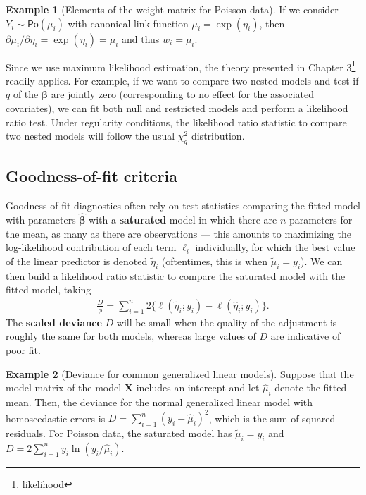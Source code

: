 \documentclass[
  11pt,
  letterpaper,
]{book}
\renewcommand{\href}[2]{#2\footnote{\url{#1}}}
\theoremstyle{definition}
\theoremstyle{definition}
\newtheorem{example}{Example}[chapter]
\theoremstyle{definition}
\theoremstyle{definition}
\theoremstyle{remark}
\begin{document}
\begin{example}[Elements of the weight matrix for Poisson data]
\protect\hypertarget{exm:weightpois}{}{\label{exm:weightpois} {} }If we consider \(Y_i \sim \mathsf{Po}(\mu_i)\) with canonical link function \(\mu_i = \exp(\eta_i)\), then \(\partial \mu_i/\partial \eta_i =\exp(\eta_i)= \mu_i\) and thus \(w_i=\mu_i\).
\end{example}

Since we use maximum likelihood estimation, the theory presented in
\href{likelihood}{Chapter 3} readily applies. For example, if we want to
compare two nested models and test if \(q\) of the \(\boldsymbol{\beta}\)
are jointly zero (corresponding to no effect for the associated
covariates), we can fit both null and restricted models and perform a
likelihood ratio test. Under regularity conditions, the likelihood ratio
statistic to compare two nested models will follow the usual \(\chi^2_q\)
distribution.

\hypertarget{goodness-of-fit-criteria}{%
\subsection{Goodness-of-fit criteria}\label{goodness-of-fit-criteria}}

Goodness-of-fit diagnostics often rely on test statistics comparing the
fitted model with parameters \(\widehat{\boldsymbol{\beta}}\) with a
\textbf{saturated} model in which there are \(n\) parameters for the mean, as
many as there are observations --- this amounts to maximizing the
log-likelihood contribution of each term \(\ell_i\) individually, for
which the best value of the linear predictor is denoted
\(\widetilde{\eta}_i\) (oftentimes, this is when \(\widetilde{\mu}_i=y_i\)).
We can then build a likelihood ratio statistic to compare the saturated
model with the fitted model, taking
\begin{align*}
\frac{D}{\phi}= \sum_{i=1}^n 2\{\ell(\widetilde{\eta}_i; y_i) - \ell(\widehat{\eta}_i; y_i)\}.
\end{align*}
The \textbf{scaled deviance} \(D\) will be small when the quality
of the adjustment is roughly the same for both models, whereas large
values of \(D\) are indicative of poor fit.

\begin{example}[Deviance for common generalized linear models]
\protect\hypertarget{exm:devglm}{}{\label{exm:devglm} {} }Suppose that the model matrix of the model \(\mathbf{X}\) includes an intercept and let \(\widehat{\mu}_i\) denote the fitted mean. Then, the deviance for the normal generalized linear model with homoscedastic errors is \(D = \sum_{i=1}^n (y_i - \widehat{\mu}_i)^2\), which is the sum of squared residuals. For Poisson data, the saturated model has \(\widetilde{\mu}_i=y_i\) and \(D= 2\sum_{i=1}^n y_i \ln(y_i/\widehat{\mu}_i)\).
\end{example}
\end{document}
